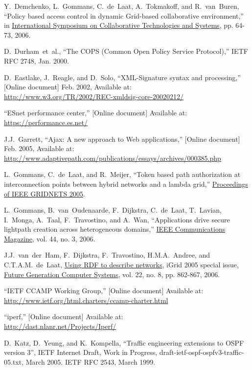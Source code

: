 \documentclass[conference]{IEEEtran}
\begin{document}
\begin{thebibliography}{1}
Y.~Demchenko, L.~Gommans, C.~de~Laat, A.~Tokmakoff, and R.~van~Buren,
``Policy based access control in dynamic Grid-based collaborative environment,''
in
\underline{International Symposium on Collaborative Technologies and Systems},
pp. 64-73, 2006.

D.~Durham~et~al.,
``The COPS (Common Open Policy Service Protocol),'' IETF RFC 2748, Jan. 2000.

D.~Eastlake, J.~Reagle, and D.~Solo,
``XML-Signature syntax and processing,'' [Online document] Feb. 2002,
Available at: \\
\url{http://www.w3.org/TR/2002/REC-xmldsig-core-20020212/}

``ESnet performance center,'' [Online document] Available at: \\
\url{https://performance.es.net/}

J.J.~Garrett,
``Ajax: A new approach to Web applications,'' [Online document] Feb. 2005,
Available at: \url{http://www.adaptivepath.com/publications/essays/archives/000385.php}

L.~Gommans, C.~de~Laat, and R.~Meijer,
``Token based path authorization at interconnection points between hybrid
networks and a lambda grid,''
\underline{Proceedings of IEEE GRIDNETS 2005}.

L.~Gommans, B.~van~Oudenaarde, F.~Dijkstra, C.~de~Laat, T.~Lavian, I.~Monga,
A.~Taal, F.~Travostino, and A.~Wan,
``Applications drive secure lightpath creation across heterogeneous domains,''
\underline{IEEE Communications Magazine},
vol. 44, no. 3, 2006.

J.J.~van~der~Ham, F.~Dijkstra, F.~Travostino, H.M.A.~Andree, and C.T.A.M.~de~Laat,
\underline{Using RDF to describe networks},
iGrid 2005 special issue,
\underline{Future Generation Computer Systems},
vol. 22, no. 8, pp. 862-867, 2006.

``IETF CCAMP Working Group,'' [Online document] Available at:
\url{http://www.ietf.org/html.charters/ccamp-charter.html}

``iperf,'' [Online document] Available at: \\
\url{http://dast.nlanr.net/Projects/Iperf/}

D.~Katz, D.~Yeung, and K.~Kompella,
``Traffic engineering extensions to OSPF version 3'',
IETF Internet Draft, Work in Progress,
draft-ietf-ospf-ospfv3-traffic-05.txt, March 2005.
IETF RFC 2543, March 1999.


\end{thebibliography}
\end{document}
